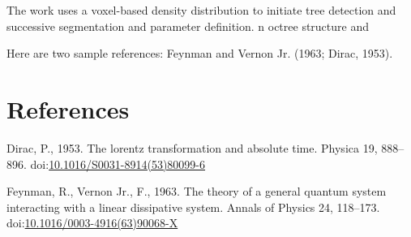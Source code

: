 \documentclass[]{elsarticle} %
\begin{document}
The work uses a voxel-based density distribution to initiate tree
detection and successive segmentation and parameter definition. n octree
structure and

Here are two sample references: Feynman and Vernon Jr. (1963; Dirac,
1953).

\hypertarget{references}{%
\section*{References}\label{references}}

\hypertarget{refs}{}
\leavevmode\hypertarget{ref-Dirac1953888}{}%
Dirac, P., 1953. The lorentz transformation and absolute time. Physica
19, 888--896.
doi:\href{https://doi.org/10.1016/S0031-8914(53)80099-6}{10.1016/S0031-8914(53)80099-6}

\leavevmode\hypertarget{ref-Feynman1963118}{}%
Feynman, R., Vernon Jr., F., 1963. The theory of a general quantum
system interacting with a linear dissipative system. Annals of Physics
24, 118--173.
doi:\href{https://doi.org/10.1016/0003-4916(63)90068-X}{10.1016/0003-4916(63)90068-X}
\end{document}
